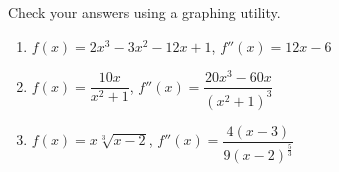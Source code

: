 \documentclass{ximera}
\begin{document}
Check your answers using a graphing utility.

\begin{enumerate}
\setcounter{enumi}{\value{HW}}


\item\label{concavederivativeexercisefirst}  $f(x) = 2x^{3}-3x^{2}-12x + 1$,  $f''(x) = 12x - 6$

\smallskip

\item $f(x) = \dfrac{10x}{x^2+1}$,  $f''(x) = \dfrac{20x^3-60x}{\left(x^2+1\right)^3}$

\smallskip

\item\label{concavederivativeexerciselast} $f(x) = x \sqrt[3]{x-2}$, $f''(x)=\dfrac{4(x-3)}{9(x-2)^{\frac{5}{3}}}$ 

\smallskip

\setcounter{HW}{\value{enumi}}
\end{enumerate}
\end{document}
